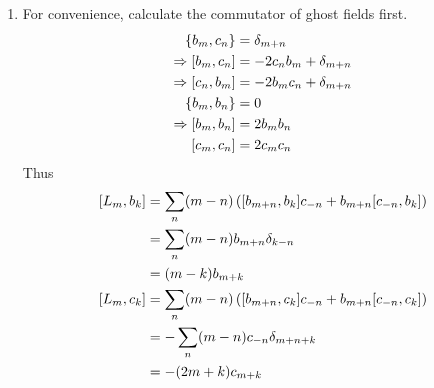 \begin{enumerate}[label=(\alph*)]
	\item 
		For convenience, calculate the commutator of ghost fields first.
		\begin{align*}
			\acomm{b_m}{c_n} &= \delta_{m+n} \\
			\Rightarrow \comm{b_m}{c_n} &= - 2 c_n b_m + \delta_{m+n} \\
			\Rightarrow \comm{c_n}{b_m} &= - 2  b_m c_n+ \delta_{m+n} \\
			\acomm{b_m}{b_n} &= 0 \\
			\Rightarrow\comm{b_m}{b_n} &= 2 b_m b_n \\
			\comm{c_m}{c_n} &= 2 c_m c_n
		\end{align*}
		Thus
		\begin{align}
			\comm{L_m}{b_k} &= \sum_{n} (m-n) \left( \comm{b_{m+n}}{b_k} c_{-n} + b_{m+n} \comm{c_{-n}}{b_k} \right) \notag \\
								 &= \sum_{n} (m-n) b_{m+n} \delta_{k-n} \notag\\
								 &= (m-k) b_{m + k} \\
			\comm{L_m}{c_k} &= \sum_n (m-n) \left( \comm{b_{m+n}}{c_k} c_{-n} + b_{m+n} \comm{c_{-n}}{c_k} \right) \notag\\
								 &= - \sum_n (m-n) c_{-n} \delta_{m+n+k} \notag\\
								 &= - (2m + k) c_{m+k}
		\end{align}


\end{enumerate}
